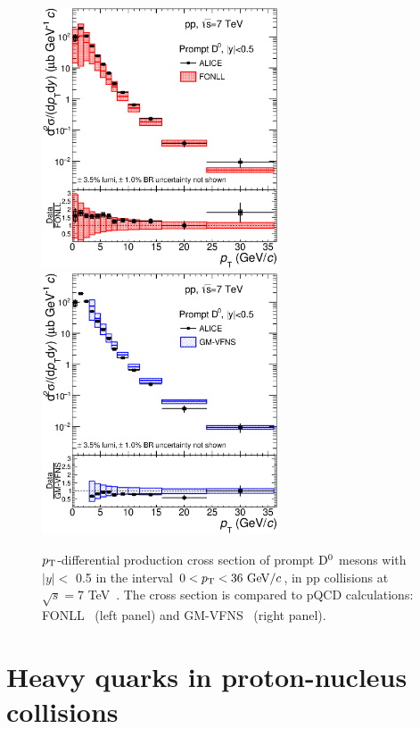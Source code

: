\begin{figure}[!ht]
  \centering
  \includegraphics[width=7cm]{FigCap2/DzeroppCrossSecVsFONLLAndRatio.eps}
  \includegraphics[width=7cm]{FigCap2/DzeroppCrossSecVsGMVFNSAndRatio.eps}
  \caption{$p_{\rm T}$-differential production cross section of prompt ${\rm D^0}$ mesons with $|y| < $ 0.5 in the interval $0 < p_{\rm T} < 36 ~\mathrm{GeV}/c$, in pp collisions at $\sqrt{s} = 7$ TeV~\cite{Acharya:2017jgo}. The cross section is compared to pQCD calculations: FONLL~\cite{Cacciari:1998it,Cacciari:2001td} (left panel) and GM-VFNS~\cite{Kniehl:2004fy} (right panel).}
  \label{fig:CharmXsec}
\end{figure}

\section{Heavy quarks in proton-nucleus collisions}
